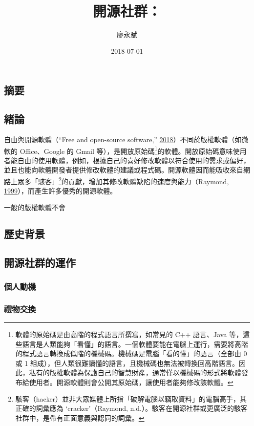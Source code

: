 \documentclass[]{tufte-handout}
\title{開源社群：}
\author{廖永賦}
\date{2018-07-01}
\begin{document}
\maketitle




\subsection{摘要}

\subsection{緒論}

自由與開源軟體（``Free and open-source software,''
\protect\hyperlink{ref-2018h}{2018}）不同於版權軟體（如微軟的
Office、Google 的 Gmail 等），是開放原始碼\footnote{軟體的原始碼是由高階的程式語言所撰寫，如常見的
  C++ 語言、Java
  等，這些語言是人類能夠「看懂」的語言。一個軟體要能在電腦上運行，需要將高階的程式語言轉換成低階的機械碼。機械碼是電腦「看的懂」的語言（全部由
  0 或 1
  組成），但人類很難讀懂的語言，且機械碼也無法被轉換回高階語言。因此，私有的版權軟體為保護自己的智慧財產，通常僅以機械碼的形式將軟體發布給使用者。開源軟體則會公開其原始碼，讓使用者能夠修改該軟體。}的軟體。開放原始碼意味使用者能自由的使用軟體，例如，根據自己的喜好修改軟體以符合使用的需求或偏好，並且也能向軟體開發者提供修改軟體的建議或程式碼。開源軟體因而能吸收來自網路上眾多「駭客」\footnote{駭客（hacker）並非大眾媒體上所指「破解電腦以竊取資料」的電腦高手，其正確的詞彙應為
  `cracker'（Raymond,
  n.d.）。駭客在開源社群或更廣泛的駭客社群中，是帶有正面意義與認同的詞彙。}的貢獻，增加其修改軟體缺陷的速度與能力（Raymond,
\protect\hyperlink{ref-raymond1999}{1999}），而產生許多優秀的開源軟體。

一般的版權軟體不會

\subsection{歷史背景}

\subsection{開源社群的運作}

\subsubsection{個人動機}

\subsubsection{禮物交換}
\end{document}
